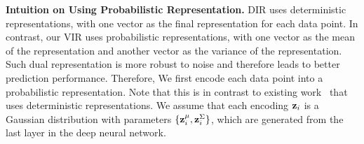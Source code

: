 
{\textbf{Intuition on Using Probabilistic Representation.} 
DIR uses deterministic representations, with one vector as the final representation for each data point. In contrast, our VIR uses probabilistic representations, with one vector as the mean of the representation and another vector as the variance of the representation. Such dual representation is more robust to noise and therefore leads to better prediction performance.} Therefore, We first encode each data point into a probabilistic representation. Note that this is in contrast to existing work~\citep{DIR} that uses deterministic representations.
We assume that each encoding ${\bf z}_i$ is a Gaussian distribution with parameters $\{{\bf z}_i^{\mu}, {\bf z}_i^{\Sigma} \}$, which are generated from the last layer in the deep neural network.

